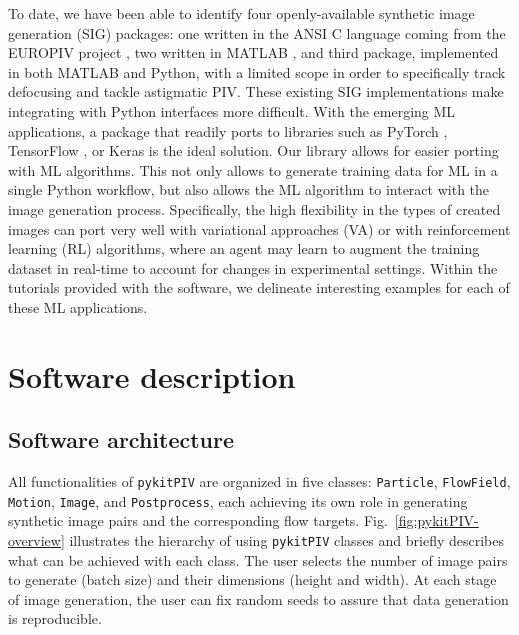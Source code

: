 \documentclass[a4paper,fleqn]{cas-dc}
\begin{document}
To date, we have been able to identify four openly-available synthetic image generation (SIG) packages: one written in the ANSI C language coming from the EUROPIV project \cite{lecordier2004europiv}, two written in MATLAB \citep{ben2020openpiv, mendes2020piv}, and third package, implemented in both MATLAB and Python, with a limited scope in order to specifically track defocusing and tackle astigmatic PIV. These existing SIG implementations make integrating with Python interfaces more difficult. With the emerging ML applications, a package that readily ports to libraries such as PyTorch \cite{paszke2017automatic, paszke2019pytorch}, TensorFlow \cite{}, or Keras \cite{} is the ideal solution. Our library allows for easier porting with ML algorithms. This not only allows to generate training data for ML in a single Python workflow, but also allows the ML algorithm to interact with the image generation process. Specifically, the high flexibility in the types of created images can port very well with variational approaches (VA) or with reinforcement learning (RL) algorithms, where an agent may learn to augment the training dataset in real-time to account for changes in experimental settings. Within the tutorials provided with the software, we delineate interesting examples for each of these ML applications.



\section{Software description} \label{sec:software}


\subsection{Software architecture}

All functionalities of \texttt{pykitPIV} are organized in five classes: \texttt{Particle}, \texttt{FlowField}, \texttt{Motion}, \texttt{Image}, and \texttt{Postprocess}, each achieving its own role in generating synthetic image pairs and the corresponding flow targets. Fig.~\ref{fig:pykitPIV-overview} illustrates the hierarchy of using \texttt{pykitPIV} classes and briefly describes what can be achieved with each class. The user selects the number of image pairs to generate (batch size) and their dimensions (height and width). At each stage of image generation, the user can fix random seeds to assure that data generation is reproducible.
\end{document}
